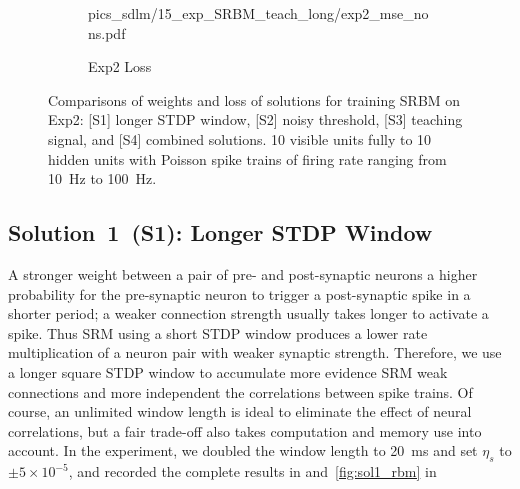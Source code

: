 \begin{figure}
\begin{subfigure}[c]{0.45\textwidth}
{			{pics_sdlm/15_exp_SRBM_teach_long/exp2_mse_nons.pdf}}\\
		\caption{Exp2 Loss}
	\end{subfigure}\caption{Comparisons of weights and loss of solutions for training SRBM on Exp2: [S1] longer STDP window, [S2] noisy threshold, [S3] teaching signal, and [S4] combined solutions. 10 visible units fully \protect{} \protect{} to 10 hidden units with Poisson spike trains of firing rate ranging from 10~Hz to 100~Hz.}
	\label{fig:sols_rbm}
\end{figure}

\subsection{Solution~1~(S1): Longer STDP Window}
A stronger weight between a pair of pre- and post-synaptic neurons \protect{} \protect{} a higher probability for the pre-synaptic neuron to trigger a post-synaptic spike in a shorter period; 
a weaker connection strength usually takes longer to activate a spike.
Thus SRM using a short STDP window produces a lower rate multiplication of a neuron pair with weaker synaptic strength.
Therefore, we use a longer square STDP window to accumulate more evidence \protect{} \protect{} SRM \protect{} \protect{} weak connections and \protect{} more independent \protect{} \protect{} the correlations between spike trains.
Of course, an unlimited window length is ideal to eliminate the effect of neural correlations, but a fair trade-off also takes computation and memory use into account.
In the experiment, we doubled the window length to 20~ms and set $\eta_s$ to $\pm 5 \times 10^{-5}$, and recorded the complete results in \protect{} \protect{} and~\ref{fig:sol1_rbm} in \protect{} \protect{}

